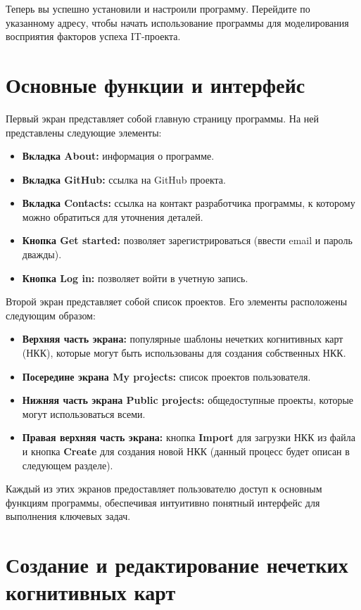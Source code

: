 \documentclass{article}
\begin{document}
    Теперь вы успешно установили и настроили программу. Перейдите по указанному адресу, чтобы начать использование программы для моделирования восприятия факторов успеха IT-проекта.
    \section{Основные функции и интерфейс}

    Первый экран представляет собой главную страницу программы. На ней представлены следующие элементы:

    \begin{itemize}
        \item \textbf{Вкладка About:} информация о программе.
        \item \textbf{Вкладка GitHub:} ссылка на GitHub проекта.
        \item \textbf{Вкладка Contacts:} ссылка на контакт разработчика программы, к которому можно обратиться для уточнения деталей.
        \item \textbf{Кнопка Get started:} позволяет зарегистрироваться (ввести email и пароль дважды).
        \item \textbf{Кнопка Log in:} позволяет войти в учетную запись.
    \end{itemize}

    Второй экран представляет собой список проектов. Его элементы расположены следующим образом:

    \begin{itemize}
        \item \textbf{Верхняя часть экрана:} популярные шаблоны нечетких когнитивных карт (НКК), которые могут быть использованы для создания собственных НКК.
        \item \textbf{Посередине экрана My projects:} список проектов пользователя.
        \item \textbf{Нижняя часть экрана Public projects:} общедоступные проекты, которые могут использоваться всеми.
        \item \textbf{Правая верхняя часть экрана:} кнопка \textbf{Import} для загрузки НКК из файла и кнопка \textbf{Create} для создания новой НКК (данный процесс будет описан в следующем разделе).
    \end{itemize}

    Каждый из этих экранов предоставляет пользователю доступ к основным функциям программы, обеспечивая интуитивно понятный интерфейс для выполнения ключевых задач.

    \section{Создание и редактирование нечетких когнитивных карт}
\end{document}
